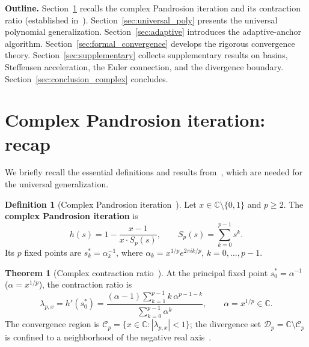 \documentclass[11pt,a4paper]{article}
\theoremstyle{definition}
\newtheorem{definition}{Definition}[section]
\newtheorem{theorem}{Theorem}[section]
\newcommand{\CC}{\mathbb{C}}
\newcommand{\Div}{\mathcal{D}}
\begin{document}
\medskip

\textbf{Outline.}
Section~\ref{sec:complex_recap} recalls the complex Pandrosion iteration and its contraction ratio (established in~\cite{besevic2026complex}).
Section~\ref{sec:universal_poly} presents the universal polynomial generalization.
Section~\ref{sec:adaptive} introduces the adaptive-anchor algorithm.
Section~\ref{sec:formal_convergence} develops the rigorous convergence theory.
Section~\ref{sec:supplementary} collects supplementary results on basins, Steffensen acceleration, the Euler connection, and the divergence boundary.
Section~\ref{sec:conclusion_complex} concludes.

\section{Complex Pandrosion iteration: recap}
\label{sec:complex_recap}

We briefly recall the essential definitions and results from~\cite{besevic2026complex}, which are needed for the universal generalization.

\begin{definition}[Complex Pandrosion iteration~{\cite[Def.\ 2.1]{besevic2026complex}}]
\label{def:complex_pandrosion}
Let $x \in \CC \setminus \{0,1\}$ and $p \geq 2$.  The \textbf{complex Pandrosion iteration} is
\begin{equation}
  \label{eq:complex_pandrosion}
  h(s) = 1 - \frac{x-1}{x \cdot S_p(s)},
  \qquad
  S_p(s) = \sum_{k=0}^{p-1} s^k.
\end{equation}
Its $p$ fixed points are $s_k^* = \alpha_k^{-1}$, where $\alpha_k = x^{1/p} e^{2\pi ik/p}$, $k = 0,\ldots,p-1$.
\end{definition}

\begin{theorem}[Complex contraction ratio~{\cite[Thm.\ 3.1]{besevic2026complex}}]
\label{thm:complex_lambda}
At the principal fixed point $s_0^* = \alpha^{-1}$ ($\alpha = x^{1/p}$), the contraction ratio is
\begin{equation}
  \label{eq:lambda_complex}
  \lambda_{p,x} = h'(s_0^*) = \frac{(\alpha - 1)\displaystyle\sum_{k=1}^{p-1} k\,\alpha^{p-1-k}}{\displaystyle\sum_{k=0}^{p-1} \alpha^k},
  \qquad \alpha = x^{1/p} \in \CC.
\end{equation}
The convergence region is $\mathcal{C}_p = \{x \in \CC : |\lambda_{p,x}| < 1\}$; the divergence set $\Div_p = \CC \setminus \mathcal{C}_p$ is confined to a neighborhood of the negative real axis~\cite[Prop.\ 3.1]{besevic2026complex}.
\end{theorem}
\end{document}
